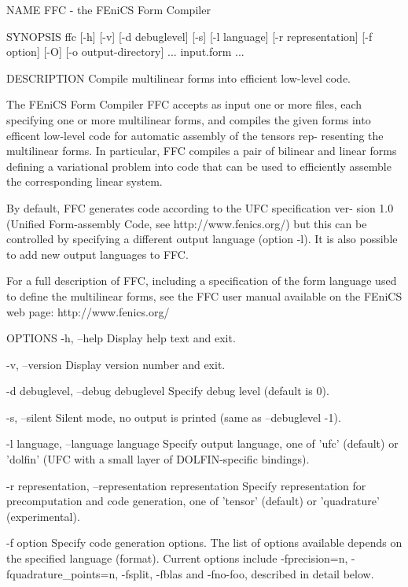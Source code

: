 NAME
       FFC - the FEniCS Form Compiler


SYNOPSIS
       ffc [-h] [-v] [-d debuglevel] [-s] [-l language] [-r representation]
       [-f option] [-O] [-o output-directory] ... input.form ...


DESCRIPTION
       Compile multilinear forms into efficient low-level code.

       The FEniCS Form Compiler FFC accepts as input one or more  files,  each
       specifying  one or more multilinear forms, and compiles the given forms
       into efficent low-level code for automatic assembly of the tensors rep-
       resenting  the multilinear forms. In particular, FFC compiles a pair of
       bilinear and linear forms defining a variational problem into code that
       can be used to efficiently assemble the corresponding linear system.

       By  default, FFC generates code according to the UFC specification ver-
       sion 1.0 (Unified Form-assembly Code, see  http://www.fenics.org/)  but
       this  can  be  controlled  by  specifying  a  different output language
       (option -l). It is also possible to add new output languages to FFC.

       For a full description of FFC, including a specification  of  the  form
       language  used to define the multilinear forms, see the FFC user manual
       available on the FEniCS web page: http://www.fenics.org/


OPTIONS
       -h, --help
              Display help text and exit.

       -v, --version
              Display version number and exit.

       -d debuglevel, --debug debuglevel
              Specify debug level (default is 0).

       -s, --silent
              Silent mode, no output is printed (same as --debuglevel -1).

       -l language, --language language
              Specify output language, one of 'ufc' (default) or 'dolfin' (UFC
              with a small layer of DOLFIN-specific bindings).

       -r representation, --representation representation
              Specify  representation  for precomputation and code generation,
              one of 'tensor' (default) or 'quadrature' (experimental).

       -f option
              Specify  code generation options. The list of options available
              depends on the specified language (format). Current options
              include -fprecision=n, -fquadrature_points=n,
              -fsplit, -fblas and -fno-foo, described in detail
              below.

